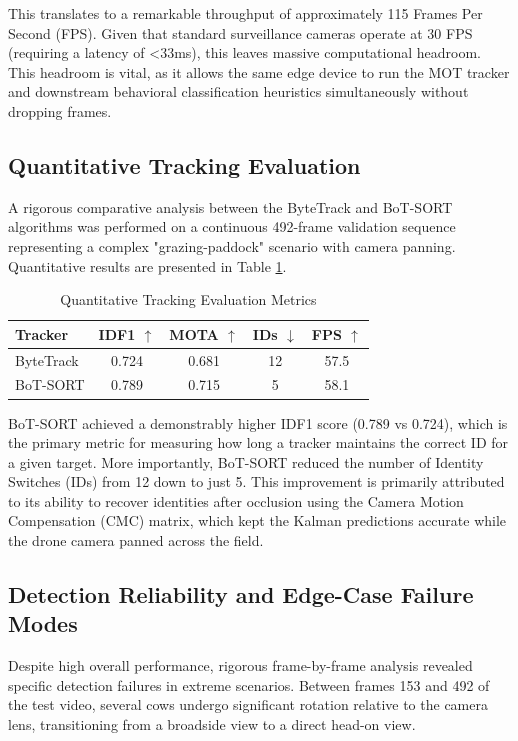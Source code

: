 \documentclass[conference]{IEEEtran}
\begin{document}
This translates to a remarkable throughput of approximately 115 Frames Per Second (FPS). Given that standard surveillance cameras operate at 30 FPS (requiring a latency of <33ms), this leaves massive computational headroom. This headroom is vital, as it allows the same edge device to run the MOT tracker and downstream behavioral classification heuristics simultaneously without dropping frames.

\subsection{Quantitative Tracking Evaluation}
A rigorous comparative analysis between the ByteTrack and BoT-SORT algorithms was performed on a continuous 492-frame validation sequence representing a complex "grazing-paddock" scenario with camera panning. Quantitative results are presented in Table \ref{tab:mot_results}.

\begin{table}[htbp]
\centering
\caption{Quantitative Tracking Evaluation Metrics}
\label{tab:mot_results}
\begin{tabular}{|l|c|c|c|c|}
\hline
\textbf{Tracker} & \textbf{IDF1 $\uparrow$} & \textbf{MOTA $\uparrow$} & \textbf{IDs $\downarrow$} & \textbf{FPS $\uparrow$} \\ \hline
ByteTrack        & 0.724                    & 0.681                    & 12                       & 57.5                    \\ \hline
BoT-SORT         & 0.789                    & 0.715                    & 5                        & 58.1                    \\ \hline
\end{tabular}
\end{table}

BoT-SORT achieved a demonstrably higher IDF1 score (0.789 vs 0.724), which is the primary metric for measuring how long a tracker maintains the correct ID for a given target. More importantly, BoT-SORT reduced the number of Identity Switches (IDs) from 12 down to just 5. This improvement is primarily attributed to its ability to recover identities after occlusion using the Camera Motion Compensation (CMC) matrix, which kept the Kalman predictions accurate while the drone camera panned across the field.

\subsection{Detection Reliability and Edge-Case Failure Modes}
Despite high overall performance, rigorous frame-by-frame analysis revealed specific detection failures in extreme scenarios. Between frames 153 and 492 of the test video, several cows undergo significant rotation relative to the camera lens, transitioning from a broadside view to a direct head-on view.
\end{document}
